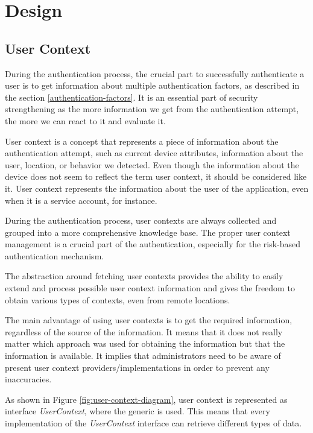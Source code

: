 \chapter{Design}

\section{User Context}
During the authentication process, the crucial part to successfully authenticate a user is to get information about multiple authentication factors, as described in the section \ref{authentication-factors}.
It is an essential part of security strengthening as the more information we get from the authentication attempt, the more we can react to it and evaluate it.

User context is a concept that represents a piece of information about the authentication attempt, such as current device attributes, information about the user, location, or behavior we detected.
Even though the information about the device does not seem to reflect the term user context, it should be considered like it.
User context represents the information about the user of the application, even when it is a service account, for instance.

During the authentication process, user contexts are always collected and grouped into a more comprehensive knowledge base.
The proper user context management is a crucial part of the authentication, especially for the risk-based authentication mechanism.

The abstraction around fetching user contexts provides the ability to easily extend and process possible user context information and gives the freedom to obtain various types of contexts, even from remote locations.

The main advantage of using user contexts is to get the required information, regardless of the source of the information.
It means that it does not really matter which approach was used for obtaining the information but that the information is available.
It implies that administrators need to be aware of present user context providers/implementations in order to prevent any inaccuracies.

\newpage

As shown in Figure \ref{fig:user-context-diagram}, user context is represented as interface \textit{UserContext}, where the generic is used.
This means that every implementation of the \textit{UserContext} interface can retrieve different types of data.

